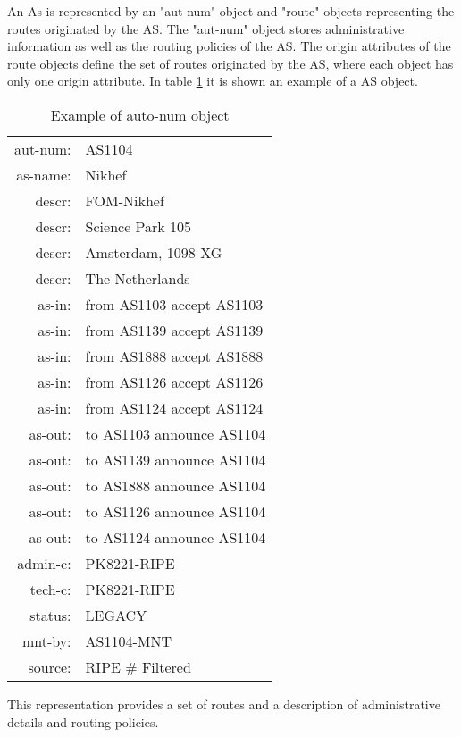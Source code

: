 \documentclass[11pt,a4paper]{scrreprt}
\begin{document}
\begin{appendices}
An As is represented by an "aut-num" object and "route" objects representing the routes originated by the AS. The "aut-num" object stores administrative information as well as the routing policies of the AS. The origin attributes of the route objects define the set of routes originated by the AS, where each object has only one origin attribute. In table \ref{table:4} it is shown an example of a AS object.  
    
\begin{table}[!h]
\centering
\begin{tabular}{  r  l  }

aut-num:    &      	AS1104\\
as-name:    &      	Nikhef\\
descr:   	&     	FOM-Nikhef\\
descr:   	&    	Science Park 105\\
descr:		&   		Amsterdam, 1098 XG\\
descr:   	&	    The Netherlands\\
as-in:  		&       from AS1103 accept AS1103\\
as-in:  		&       from AS1139 accept AS1139\\
as-in:  		&       from AS1888 accept AS1888\\
as-in:  		&       from AS1126 accept AS1126\\
as-in:  		&       from AS1124 accept AS1124\\
as-out:  	&       to AS1103 announce AS1104\\
as-out:  	&       to AS1139 announce AS1104\\
as-out:  	&       to AS1888 announce AS1104\\
as-out:  	&       to AS1126 announce AS1104\\
as-out:  	&       to AS1124 announce AS1104\\
admin-c: 	&       PK8221-RIPE\\
tech-c:  	&       PK8221-RIPE\\
status:  	&       LEGACY\\
mnt-by:  	&       AS1104-MNT\\
source:  	&       RIPE \# Filtered\\

\end{tabular}
\caption{Example of auto-num object}
\label{table:4}
\end{table} 

This representation provides a set of routes and a description of administrative details and routing policies. 
        

\end{appendices}
\end{document}
